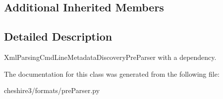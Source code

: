 \subsection*{Additional Inherited Members}


\subsection{Detailed Description}
\begin{DoxyVerb}XmlParsingCmdLineMetadataDiscoveryPreParser with a dependency.\end{DoxyVerb}
 

The documentation for this class was generated from the following file\-:\begin{DoxyCompactItemize}
\item 
cheshire3/formats/pre\-Parser.\-py\end{DoxyCompactItemize}
